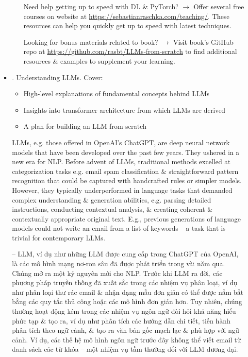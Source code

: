 \documentclass{article}
\begin{document}
\begin{itemize}
\begin{itemize}
		Need help getting up to speed with DL \& PyTorch? $\to$ Offer several free courses on website at \url{https://sebastianraschka.com/teaching/}. These resources can help you quickly get up to speed with latest techniques.
		
		Looking for bonus materials related to book? $\to$ Visit book's GitHub repo at \url{https://github.com/rasbt/LLMs-from-scratch} to find additional resources \& examples to supplement your learning.		
	\end{itemize}
	\item {. Understanding LLMs.} Cover:
	\begin{itemize}
		\item High-level explanations of fundamental concepts behind LLMs
		\item Insights into transformer architecture from which LLMs are derived
		\item A plan for building an LLM from scratch
	\end{itemize}
	LLMs, e.g. those offered in OpenAI's ChatGPT, are deep neural network models that have been developed over the past few years. They ushered in a new era for NLP. Before advent of LLMs, traditional methods excelled at categorization tasks e.g. email spam classification \& straightforward pattern recognition that could be captured with handcrafted rules or simpler models. However, they typically underperformed in language tasks that demanded complex understanding \& generation abilities, e.g. parsing detailed instructions, conducting contextual analysis, \& creating coherent \& contextually appropriate original text. E.g., previous generations of language models could not write an email from a list of keywords -- a task that is trivial for contemporary LLMs.
	
	-- LLM, ví dụ như những LLM được cung cấp trong ChatGPT của OpenAI, là các mô hình mạng nơ-ron sâu đã được phát triển trong vài năm qua. Chúng mở ra một kỷ nguyên mới cho NLP. Trước khi LLM ra đời, các phương pháp truyền thống đã xuất sắc trong các nhiệm vụ phân loại, ví dụ như phân loại thư rác email \& nhận dạng mẫu đơn giản có thể được nắm bắt bằng các quy tắc thủ công hoặc các mô hình đơn giản hơn. Tuy nhiên, chúng thường hoạt động kém trong các nhiệm vụ ngôn ngữ đòi hỏi khả năng hiểu phức tạp \& tạo ra, ví dụ như phân tích các hướng dẫn chi tiết, tiến hành phân tích theo ngữ cảnh, \& tạo ra văn bản gốc mạch lạc \& phù hợp với ngữ cảnh. Ví dụ, các thế hệ mô hình ngôn ngữ trước đây không thể viết email từ danh sách các từ khóa -- một nhiệm vụ tầm thường đối với LLM đương đại.
	

\end{itemize}
\end{document}
